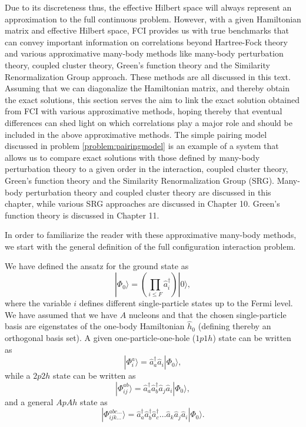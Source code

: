  Due to its discreteness thus, the effective Hilbert space will
  always represent an approximation to the full continuous problem.
  However, with a given Hamiltonian matrix and effective Hilbert
  space, FCI provides us with true benchmarks that can convey
  important information on correlations beyond Hartree-Fock theory and
  various approximative many-body methods like many-body perturbation
  theory, coupled cluster theory, Green's function theory and the
  Similarity Renormalization Group approach. These methods are all
  discussed in this text.  Assuming that we can diagonalize the
  Hamiltonian matrix, and thereby obtain the exact solutions, this
  section serves the aim to link the exact solution obtained from FCI with various
  approximative methods, hoping thereby that eventual differences can
  shed light on which correlations  play a major role and should be
  included in the above approximative methods. The simple pairing
  model discussed in problem \ref{problem:pairingmodel} is an example
  of a system that allows us to compare exact solutions with
  those defined by many-body perturbation theory to a given order in
  the interaction, coupled cluster theory, Green's function theory and
  the Similarity Renormalization Group (SRG). Many-body perturbation
  theory and coupled cluster theory are discussed in this chapter,
  while various SRG approaches are discussed in Chapter 10. Green's
  function theory is discussed in Chapter 11.

  In order to familiarize the reader with these approximative
  many-body methods, we start with the general definition of the full
  configuration interaction problem.

  We have defined the ansatz for the ground state as
  \[
  |\Phi_0\rangle = \left(\prod_{i\le
    F}\hat{a}_{i}^{\dagger}\right)|0\rangle,
  \]
  where the variable  $i$ defines different single-particle states up to
  the Fermi level. We have assumed that we have $A$ nucleons and that the chosen single-particle basis are eigenstates of 
the one-body Hamiltonian $\hat{h}_0$ (defining thereby an orthogonal basis set).  
A given
  one-particle-one-hole ($1p1h$) state can be written as
  \[
  |\Phi_i^a\rangle = \hat{a}_{a}^{\dagger}\hat{a}_i|\Phi_0\rangle,
  \]
  while a $2p2h$ state can be written as
  \[
  |\Phi_{ij}^{ab}\rangle =
  \hat{a}_{a}^{\dagger}\hat{a}_{b}^{\dagger}\hat{a}_j\hat{a}_i|\Phi_0\rangle,
  \]
  and a general $ApAh$ state as
  \[
  |\Phi_{ijk\dots}^{abc\dots}\rangle =
  \hat{a}_{a}^{\dagger}\hat{a}_{b}^{\dagger}\hat{a}_{c}^{\dagger}\dots\hat{a}_k\hat{a}_j\hat{a}_i|\Phi_0\rangle.
  \]

